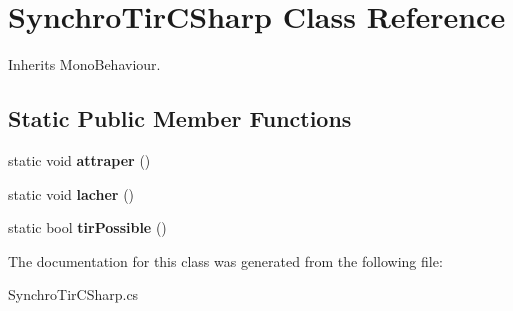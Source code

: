 \hypertarget{class_synchro_tir_c_sharp}{\section{Synchro\+Tir\+C\+Sharp Class Reference}
\label{class_synchro_tir_c_sharp}
}


Inherits Mono\+Behaviour.

\subsection*{Static Public Member Functions}
\begin{DoxyCompactItemize}
\item 
\hypertarget{class_synchro_tir_c_sharp_a281406e6fa43148e7a61f65eecac5835}{static void {\bfseries attraper} ()}\label{class_synchro_tir_c_sharp_a281406e6fa43148e7a61f65eecac5835}

\item 
\hypertarget{class_synchro_tir_c_sharp_a587fd0b0f6767ffbbdeda464ead7cfee}{static void {\bfseries lacher} ()}\label{class_synchro_tir_c_sharp_a587fd0b0f6767ffbbdeda464ead7cfee}

\item 
\hypertarget{class_synchro_tir_c_sharp_a026e0ea690671a38d5c910e0d5ab879a}{static bool {\bfseries tir\+Possible} ()}\label{class_synchro_tir_c_sharp_a026e0ea690671a38d5c910e0d5ab879a}

\end{DoxyCompactItemize}


The documentation for this class was generated from the following file\+:\begin{DoxyCompactItemize}
\item 
Synchro\+Tir\+C\+Sharp.\+cs\end{DoxyCompactItemize}

